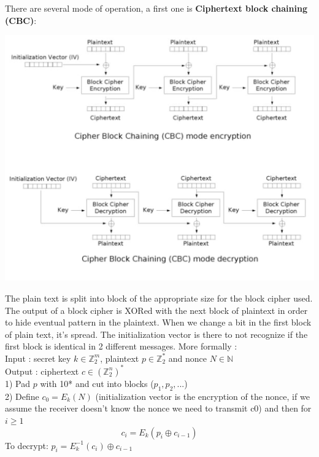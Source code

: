 \documentclass[11pt,a4paper]{report}
\begin{document}
There are several mode of operation, a first one is \textbf{Ciphertext block chaining (CBC)}:
\begin{center}
\includegraphics[scale=0.5]{img/img9.png}
\end{center}
The plain text is split into block of the appropriate size for the block cipher used. The output of a block cipher is XORed with the next block of plaintext in order to hide eventual pattern in the plaintext. When we change a bit in the first block of plain text, it's spread. The initialization vector is there to not recognize if the first block is identical in 2 different messages. More formally :\\
Input : secret key $k \in \mathbb{Z}_2^{m}$, plaintext $p \in \mathbb{Z}_2^*$ and nonce $N \in \mathbb{N}$\\
Output : ciphertext $c \in \left(\mathbb{Z}_2^n\right)^*$\\
1) Pad $p$ with 10* and cut into blocks ($p_1, p_2, ...$)\\
2) Define $c_0 = E_k(N)$ (initialization vector is the encryption of the nonce, if we assume the receiver doesn't know the nonce we need to transmit c0) and then for $i \geq 1$
$$c_i = E_k(p_i \oplus c_{i-1})$$
To decrypt:		$p_i = E_k^{-1} (c_i) \oplus c_{i-1}$\\
\end{document}
